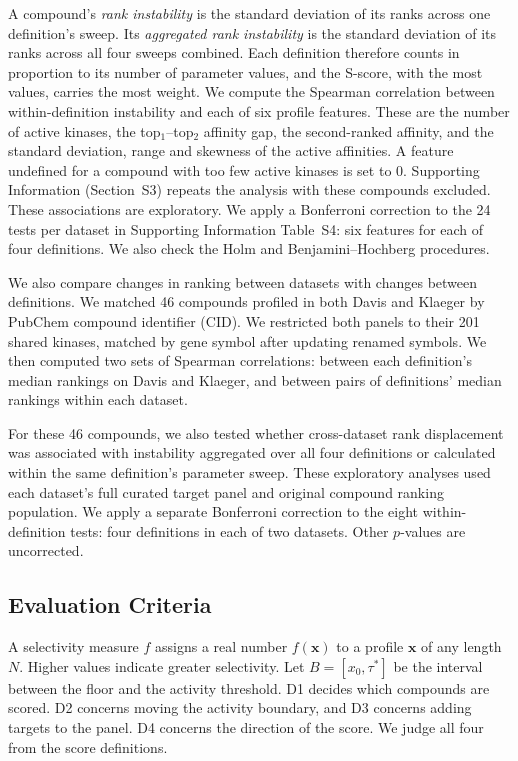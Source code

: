 A compound's \emph{rank instability} is the standard deviation of its ranks
across one definition's sweep. Its \emph{aggregated rank instability} is the standard
deviation of its ranks across all four sweeps combined. Each
definition therefore counts in proportion to its number of parameter values,
and the S-score, with the most values, carries the most weight.
We compute the Spearman correlation between within-definition instability and
each of six profile features. These are the number of active kinases, the
top$_1$--top$_2$ affinity gap, the second-ranked affinity, and the standard
deviation, range and skewness of the active affinities. A feature undefined for a compound with
too few active kinases is set to $0$. Supporting Information (Section~S3)
repeats the analysis with these compounds excluded.
These associations are exploratory. We apply a Bonferroni correction to the
24 tests per dataset in Supporting Information Table~S4: six features for each
of four definitions. We also check the Holm and Benjamini--Hochberg procedures.

We also compare changes in ranking between datasets with changes between
definitions. We matched 46 compounds profiled in both Davis and Klaeger by
PubChem compound identifier (CID). We restricted both panels to their 201
shared kinases, matched by gene symbol after updating renamed symbols. We
then computed two sets of Spearman correlations: between each definition's
median rankings on Davis and Klaeger, and between pairs of definitions'
median rankings within each dataset.

For these 46 compounds, we also tested whether cross-dataset rank displacement
was associated with instability aggregated over all four definitions or
calculated within the same definition's parameter sweep. These exploratory
analyses used each dataset's full curated target panel and original compound
ranking population. We apply a separate Bonferroni correction to the eight
within-definition tests: four definitions in each of two datasets. Other
$p$-values are uncorrected.

\subsection{Evaluation Criteria}
\label{sec:methods:criteria}

A selectivity measure $f$ assigns a real number $f(\mathbf{x})$ to a profile
$\mathbf{x}$ of any length $N$. Higher values indicate greater selectivity.
Let $B = [x_0, \tau^*]$ be the interval between the floor and the activity
threshold. D1 decides which compounds are scored.
D2 concerns moving the activity boundary, and D3 concerns adding targets to
the panel. D4 concerns the direction of the score. We judge all four from the
score definitions.


